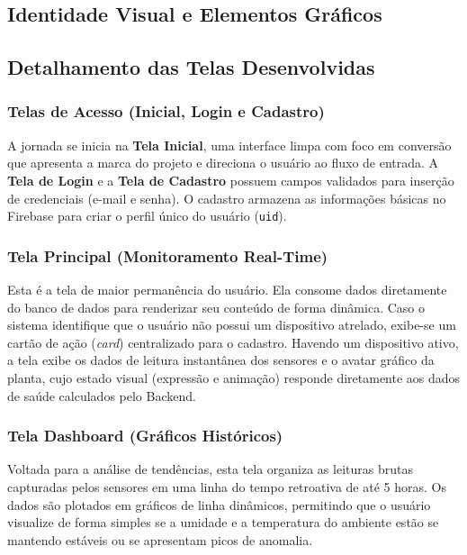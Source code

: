 \documentclass[
	12pt,
	article,
	oneside,
	a4paper,
	english,
	brazil
	]{abntex2}
\begin{document}
\subsection{Identidade Visual e Elementos Gráficos}

\subsection{Detalhamento das Telas Desenvolvidas}

\subsubsection{Telas de Acesso (Inicial, Login e Cadastro)}
A jornada se inicia na \textbf{Tela Inicial}, uma interface limpa com foco em conversão que apresenta a marca do projeto e direciona o usuário ao fluxo de entrada. A \textbf{Tela de Login} e a \textbf{Tela de Cadastro} possuem campos validados para inserção de credenciais (e-mail e senha). O cadastro armazena as informações básicas no Firebase para criar o perfil único do usuário (\texttt{uid}).

\subsubsection{Tela Principal (Monitoramento Real-Time)}
Esta é a tela de maior permanência do usuário. Ela consome dados diretamente do banco de dados para renderizar seu conteúdo de forma dinâmica. Caso o sistema identifique que o usuário não possui um dispositivo atrelado, exibe-se um cartão de ação (\textit{card}) centralizado para o cadastro. Havendo um dispositivo ativo, a tela exibe os dados de leitura instantânea dos sensores e o avatar gráfico da planta, cujo estado visual (expressão e animação) responde diretamente aos dados de saúde calculados pelo Backend.

\subsubsection{Tela Dashboard (Gráficos Históricos)}
Voltada para a análise de tendências, esta tela organiza as leituras brutas capturadas pelos sensores em uma linha do tempo retroativa de até 5 horas. Os dados são plotados em gráficos de linha dinâmicos, permitindo que o usuário visualize de forma simples se a umidade e a temperatura do ambiente estão se mantendo estáveis ou se apresentam picos de anomalia.
\end{document}
